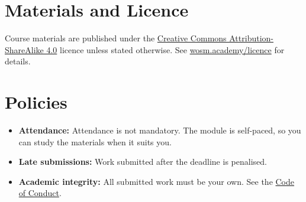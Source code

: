 \documentclass[11pt,a4paper]{article}
\begin{document}
\section{Materials and Licence}
Course materials are published under the
\href{https://creativecommons.org/licenses/by-sa/4.0/}{Creative Commons Attribution-ShareAlike 4.0}
licence unless stated otherwise. See \href{https://wosm.academy/licence/}{wosm.academy/licence} for details.

\section{Policies}
\begin{itemize}
  \item \textbf{Attendance:} Attendance is not mandatory. The module is self-paced, so you can study the materials when it suits you.
  \item \textbf{Late submissions:} Work submitted after the deadline is penalised.
  \item \textbf{Academic integrity:} All submitted work must be your own.
        See the \href{https://wosm.academy/code-of-conduct/}{Code of Conduct}.
\end{itemize}
\end{document}
